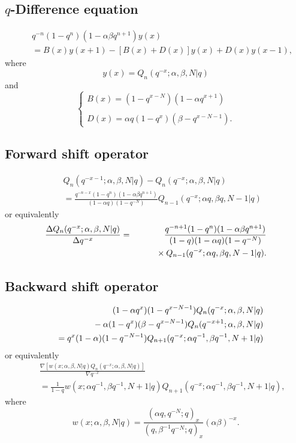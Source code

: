 \documentclass[envcountchap,graybox]{svmono}
\newcommand{\mathindent}{\hspace{7.5mm}}
\begin{document}
\subsection*{$q$-Difference equation}
\begin{eqnarray}
\label{dvqHahn}
& &q^{-n}(1-q^n)(1-\alpha\beta q^{n+1})y(x)\nonumber\\
& &{}=B(x)y(x+1)-\left[B(x)+D(x)\right]y(x)+D(x)y(x-1),
\end{eqnarray}
where
$$y(x)=Q_n(q^{-x};\alpha,\beta,N|q)$$
and
$$\left\{\begin{array}{l}\displaystyle B(x)=(1-q^{x-N})(1-\alpha q^{x+1})\\
\\
\displaystyle D(x)=\alpha q(1-q^x)(\beta-q^{x-N-1}).\end{array}\right.$$

\newpage

\subsection*{Forward shift operator}
\begin{eqnarray}
\label{shift1qHahnI}
& &Q_n(q^{-x-1};\alpha,\beta,N|q)-Q_n(q^{-x};\alpha,\beta,N|q)\nonumber\\
& &{}=\frac{q^{-n-x}(1-q^n)(1-\alpha\beta q^{n+1})}{(1-\alpha q)(1-q^{-N})}
Q_{n-1}(q^{-x};\alpha q,\beta q,N-1|q)
\end{eqnarray}
or equivalently
\begin{eqnarray}
\label{shift1qHahnII}
\frac{\Delta Q_n(q^{-x};\alpha,\beta,N|q)}{\Delta q^{-x}}
&=&\frac{q^{-n+1}(1-q^n)(1-\alpha\beta q^{n+1})}{(1-q)(1-\alpha q)(1-q^{-N})}\nonumber\\
& &{}\mathindent{}\times Q_{n-1}(q^{-x};\alpha q,\beta q,N-1|q).
\end{eqnarray}

\subsection*{Backward shift operator}
\begin{eqnarray}
\label{shift2qHahnI}
& &(1-\alpha q^x)(1-q^{x-N-1})Q_n(q^{-x};\alpha,\beta,N|q)\nonumber\\
& &{}\mathindent{}-\alpha(1-q^x)(\beta-q^{x-N-1})Q_n(q^{-x+1};\alpha,\beta,N|q)\nonumber\\
& &{}=q^x(1-\alpha)(1-q^{-N-1})Q_{n+1}(q^{-x};\alpha q^{-1},\beta q^{-1},N+1|q)
\end{eqnarray}
or equivalently
\begin{eqnarray}
\label{shift2qHahnII}
& &\frac{\nabla\left[w(x;\alpha,\beta,N|q)Q_n(q^{-x};\alpha,\beta,N|q)\right]}{\nabla q^{-x}}\nonumber\\
& &{}=\frac{1}{1-q}w(x;\alpha q^{-1},\beta q^{-1},N+1|q)Q_{n+1}(q^{-x};\alpha q^{-1},\beta q^{-1},N+1|q),
\end{eqnarray}
where
$$w(x;\alpha,\beta,N|q)=\frac{(\alpha q,q^{-N};q)_x}{(q,\beta^{-1}q^{-N};q)_x}(\alpha\beta)^{-x}.$$
\end{document}
